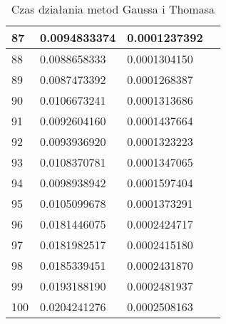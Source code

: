 \documentclass{article}
\begin{document}
\begin{table}[H]
{\begin{tabular}{|l|l|l|l|}
87 & 0.0094833374 & 0.0001237392 \\ \hline
88 & 0.0088658333 & 0.0001304150 \\ \hline
89 & 0.0087473392 & 0.0001268387 \\ \hline
90 & 0.0106673241 & 0.0001313686 \\ \hline
91 & 0.0092604160 & 0.0001437664 \\ \hline
92 & 0.0093936920 & 0.0001323223 \\ \hline
93 & 0.0108370781 & 0.0001347065 \\ \hline
94 & 0.0098938942 & 0.0001597404 \\ \hline
95 & 0.0105099678 & 0.0001373291 \\ \hline
96 & 0.0181446075 & 0.0002424717 \\ \hline
97 & 0.0181982517 & 0.0002415180 \\ \hline
98 & 0.0185339451 & 0.0002431870 \\ \hline
99 & 0.0193188190 & 0.0002481937 \\ \hline
100 & 0.0204241276 & 0.0002508163 \\ \hline
\end{tabular}
}
\caption{Czas działania metod Gaussa i Thomasa}
\end{table}
\end{document}
